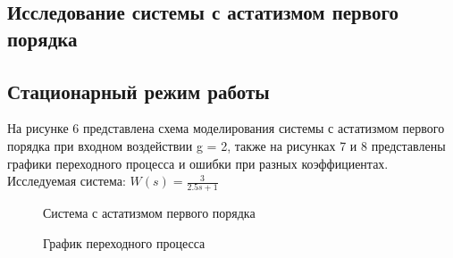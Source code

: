 \documentclass[a4paper, 11pt]{article}
\begin{document}
\begin{center}
\section{Исследование системы с астатизмом первого порядка}
\end{center}
\subsection{Стационарный режим работы}На рисунке 6 представлена схема моделирования системы с астатизмом первого порядка при входном воздействии g = 2, также на рисунках 7 и 8 представлены графики переходного процесса и ошибки при разных коэффициентах.\\
Исследуемая система: \large{$W(s)=\frac{3}{2.5s+1}$}


\begin{figure}[h!]
    \caption{Система с астатизмом первого порядка}
    \label{one}
\end{figure}

\begin{figure}[h!]
    \caption{График переходного процесса}
    \label{two}
\end{figure}
\end{document}
